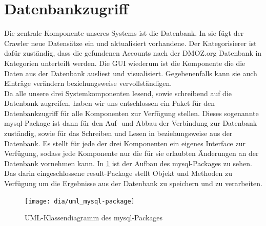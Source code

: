 \section{Datenbankzugriff}\label{sec:datenbankzugriff}
Die zentrale Komponente unseres Systems ist die Datenbank. In sie fügt der Crawler neue Datensätze ein und aktualisiert vorhandene. Der Kategorisierer ist dafür zuständig, dass die gefundenen Accounts nach der DMOZ.org Datenbank in Kategorien unterteilt werden. Die GUI wiederum ist die Komponente die die Daten aus der Datenbank ausliest und visualisiert. Gegebenenfalls kann sie auch Einträge verändern beziehungsweise vervollständigen.
\\Da alle unsere drei Systemkomponenten lesend, sowie schreibend auf die Datenbank zugreifen, haben wir uns entschlossen ein Paket für den Datenbankzugriff für alle Komponenten zur Verfügung stellen. Dieses sogenannte mysql-Package ist dann für den Auf- und Abbau der Verbindung zur Datenbank zuständig, sowie für das Schreiben und Lesen in beziehungsweise aus der Datenbank. Es stellt für jede der drei Komponenten ein eigenes Interface zur Verfügung, sodass jede Komponente nur die für sie erlaubten Änderungen an der Datenbank vornehmen kann.
In \cref{fig:mysql-package} ist der Aufbau des mysql-Packages zu sehen. Das darin eingeschlossene result-Package stellt Objekt und Methoden zu Verfügung um die Ergebnisse aus der Datenbank zu speichern und zu verarbeiten.

\begin{figure}[h!]
	\centering
	\texttt{[image: dia/uml\_mysql-package]}
	\caption{UML-Klassendiagramm des mysql-Packages}
	\label{fig:mysql-package}
\end{figure}

